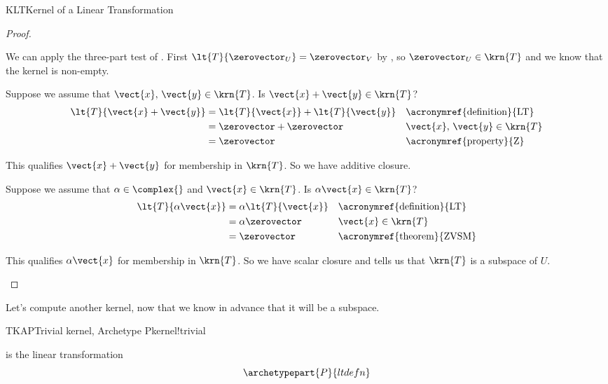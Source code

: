 \begin{subsect}{KLT}{Kernel of a Linear Transformation}
\begin{proof}
\begin{para}We can apply the three-part test of .  First $\lt{T}{\zerovector_U}=\zerovector_V$ by , so $\zerovector_U\in\krn{T}$ and we know that the kernel is non-empty.\end{para}
%
\begin{para}Suppose we assume that $\vect{x},\,\vect{y}\in\krn{T}$.  Is $\vect{x}+\vect{y}\in\krn{T}$?
%
\begin{align*}
\lt{T}{\vect{x}+\vect{y}}&=\lt{T}{\vect{x}}+\lt{T}{\vect{y}}&&\text{\acronymref{definition}{LT}}\\
&=\zerovector+\zerovector&&\vect{x},\,\vect{y}\in\krn{T}\\
&=\zerovector&&\text{\acronymref{property}{Z}}
\end{align*}\end{para}
%
\begin{para}This qualifies $\vect{x}+\vect{y}$ for membership in $\krn{T}$.  So we have additive closure.\end{para}
%
\begin{para}Suppose we assume that $\alpha\in\complex{\null}$ and $\vect{x}\in\krn{T}$.  Is $\alpha\vect{x}\in\krn{T}$?
%
\begin{align*}
\lt{T}{\alpha\vect{x}}&=\alpha\lt{T}{\vect{x}}&&\text{\acronymref{definition}{LT}}\\
&=\alpha\zerovector&&\vect{x}\in\krn{T}\\
&=\zerovector&&\text{\acronymref{theorem}{ZVSM}}
\end{align*}
\end{para}
%
\begin{para}This qualifies $\alpha\vect{x}$ for membership in $\krn{T}$.  So we have scalar closure and  tells us that $\krn{T}$ is a subspace of $U$.\end{para}
%
\end{proof}
%
\begin{para}Let's compute another kernel, now that we know in advance that it will be a subspace.\end{para}
%
\begin{example}{TKAP}{Trivial kernel, Archetype P}{kernel!trivial}
\begin{para} is the linear transformation
%
\begin{equation*}
\archetypepart{P}{ltdefn}\end{equation*}
\end{para}

\end{example}
\end{subsect}
